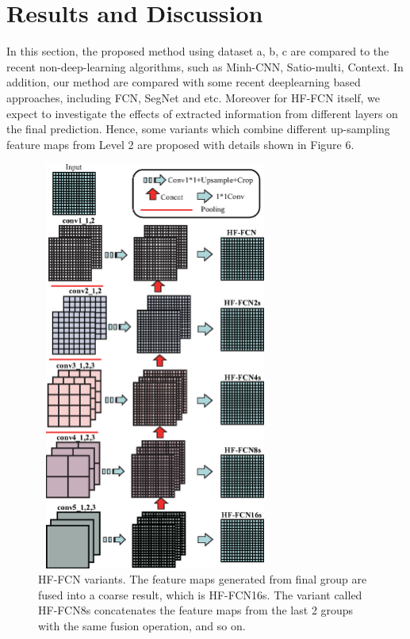 \section{Results and Discussion}
In this section, the proposed method using dataset a, b, c are compared to the recent non-deep-learning algorithms, such as Minh-CNN\cite{IEEEexample:mnih2013machine}, Satio-multi\cite{IEEEexample:saito2016multiple}, Context\cite{IEEEexample:audebert2017deep}. In addition, our method are compared with some recent deeplearning based approaches, including FCN\cite{IEEEexample:Long_2015_CVPR}, SegNet\cite{IEEEexample:badrinarayanan2017segnet} and etc. Moreover for HF-FCN itself, we expect to investigate the effects of extracted information from different layers on the final prediction. Hence, some variants which combine different up-sampling feature maps from Level 2 are proposed with details shown in Figure 6.\par

\begin{figure}[t]
\begin{center}
\includegraphics[width=7.8cm,height = 13.5cm]{Figures/HF-FCN_vairants.eps}
\caption{HF-FCN variants. The feature maps generated from final group are fused into a coarse result, which is HF-FCN16s. The variant called HF-FCN8s concatenates the feature maps from the last 2 groups with the same fusion operation, and so on.}
\label{6}
\end{center}
\end{figure}

